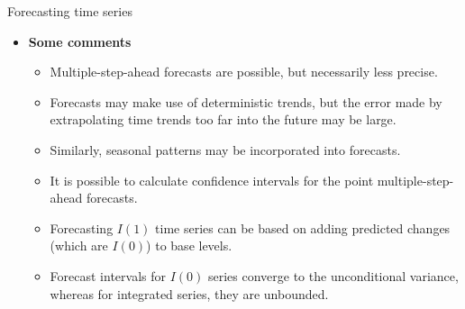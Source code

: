 \documentclass{beamer}
\begin{document}
\begin{frame}{Forecasting time series}
\begin{itemize}
\item \textbf{Some comments}
\begin{itemize}
\item Multiple-step-ahead forecasts are possible, but necessarily less precise.
\item Forecasts may make use of deterministic trends, but the error made  by extrapolating time trends too far into the future may be large.
\item Similarly, seasonal patterns may be incorporated into forecasts.
\item It is possible to calculate confidence intervals for the point multiple-step-ahead forecasts.  
\item Forecasting $I(1)$ time series can be based on adding predicted changes (which are $I(0)$) to base levels. 
\item Forecast intervals for $I(0)$ series converge to the unconditional variance, whereas for integrated series, they are unbounded.
\end{itemize}
\end{itemize}
\end{frame}
\end{document}
